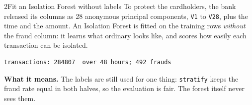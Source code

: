 
\begin{labquestion}{2}{Fit an Isolation Forest without labels}
To protect the cardholders, the bank released its columns as 28 anonymous principal components, \texttt{V1} to \texttt{V28}, plus the time and the amount. An Isolation Forest is fitted on the training rows \emph{without} the fraud column: it learns what ordinary looks like, and scores how easily each transaction can be isolated.
\end{labquestion}
\begin{labanswer}


\begin{refoutput}
\begin{lstlisting}[style=utpterminal]
transactions: 284807  over 48 hours; 492 frauds
\end{lstlisting}
\end{refoutput}

\textbf{What it means.} The labels are still used for one thing: \texttt{stratify} keeps the fraud rate equal in both halves, so the evaluation is fair. The forest itself never sees them.
\end{labanswer}

